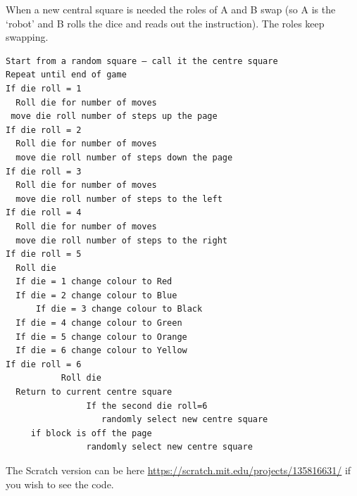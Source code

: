 When a new central square is needed the roles of A and B swap (so A is the ‘robot’ and B rolls the dice and reads out the instruction). The roles keep swapping.

\begin{lstlisting}
Start from a random square – call it the centre square
Repeat until end of game
If die roll = 1
  Roll die for number of moves
 move die roll number of steps up the page
If die roll = 2
  Roll die for number of moves
  move die roll number of steps down the page
If die roll = 3
  Roll die for number of moves
  move die roll number of steps to the left 
If die roll = 4
  Roll die for number of moves
  move die roll number of steps to the right
If die roll = 5
  Roll die
  If die = 1 change colour to Red
  If die = 2 change colour to Blue
      If die = 3 change colour to Black
  If die = 4 change colour to Green
  If die = 5 change colour to Orange
  If die = 6 change colour to Yellow
If die roll = 6
           Roll die
  Return to current centre square
                If the second die roll=6
                   randomly select new centre square
     if block is off the page
                randomly select new centre square
\end{lstlisting}

The Scratch version can be here \url{https://scratch.mit.edu/projects/135816631/} if you wish to see the code.

